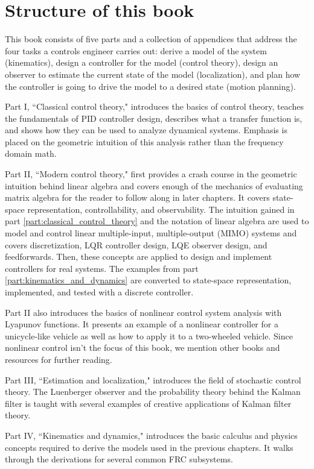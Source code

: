 \section{Structure of this book}

This book consists of five parts and a collection of appendices that address the
four tasks a controls engineer carries out: derive a model of the system
(kinematics), design a controller for the model (control theory), design an
observer to estimate the current state of the model (localization), and plan how
the controller is going to drive the model to a desired state (motion planning).

Part I, ``Classical control theory," introduces the basics of control theory,
teaches the fundamentals of PID controller design, describes what a transfer
function is, and shows how they can be used to analyze dynamical systems.
Emphasis is placed on the geometric intuition of this analysis rather than the
frequency domain math.

Part II, ``Modern control theory," first provides a crash course in the
geometric intuition behind linear algebra and covers enough of the mechanics of
evaluating matrix algebra for the reader to follow along in later chapters. It
covers state-space representation, controllability, and observability. The
intuition gained in part \ref{part:classical_control_theory} and the notation of
linear algebra are used to model and control linear multiple-input,
multiple-output (MIMO) systems and covers discretization, LQR controller design,
LQE observer design, and feedforwards. Then, these concepts are applied to
design and implement controllers for real systems. The examples from part
\ref{part:kinematics_and_dynamics} are converted to state-space representation,
implemented, and tested with a discrete controller.

Part II also introduces the basics of nonlinear control system analysis with
Lyapunov functions. It presents an example of a nonlinear controller for a
unicycle-like vehicle as well as how to apply it to a two-wheeled vehicle. Since
nonlinear control isn't the focus of this book, we mention other books and
resources for further reading.

Part III, ``Estimation and localization," introduces the field of stochastic
control theory. The Luenberger observer and the probability theory behind the
Kalman filter is taught with several examples of creative applications of Kalman
filter theory.

Part IV, ``Kinematics and dynamics," introduces the basic calculus and physics
concepts required to derive the models used in the previous chapters. It walks
through the derivations for several common FRC subsystems.


